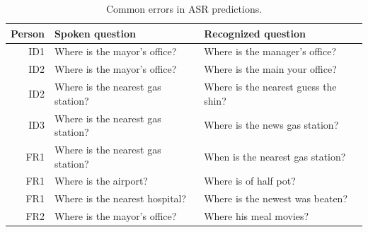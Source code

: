 \documentclass{../styles/svproc}
\begin{document}
\begin{table}[t]
	\caption{Common errors in ASR predictions.}
	\label{tab:common_errors} 
	\begin{center}
		\begin{tabular}{r@{\quad}ll}
			\hline
			\multicolumn{1}{l}{\rule{0pt}{12pt} Person} & \multicolumn{1}{l}{Spoken question} & \multicolumn{1}{l}{Recognized question} \\[2pt]
			\hline\rule{0pt}{12pt}
			ID1 & Where is the mayor's office? & Where is the manager's office? \\
			ID2 & Where is the mayor's office? & Where is the main your office? \\
			ID2 & Where is the nearest gas station? & Where is the nearest guess the shin? \\
			ID3 & Where is the nearest gas station? & Where is the news gas station? \\
			FR1 & Where is the nearest gas station? & When is the nearest gas station? \\
			FR1 & Where is the airport? & Where is of half pot? \\
			FR1 & Where is the nearest hospital? & Where is the newest was beaten? \\
			FR2 & Where is the mayor's office? & Where his meal movies? \\[2pt]
			\hline
		\end{tabular}
	\end{center}
\end{table}
\end{document}
